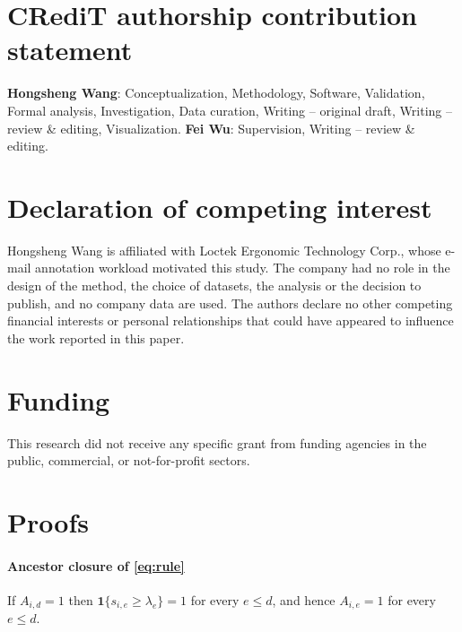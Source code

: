 \documentclass[preprint,12pt]{elsarticle}
\theoremstyle{definition}
\theoremstyle{remark}
\begin{document}
\section*{CRediT authorship contribution statement}
\textbf{Hongsheng Wang}: Conceptualization, Methodology, Software, Validation,
Formal analysis, Investigation, Data curation, Writing -- original draft,
Writing -- review \& editing, Visualization. \textbf{Fei Wu}: Supervision,
Writing -- review \& editing.

\section*{Declaration of competing interest}
Hongsheng Wang is affiliated with Loctek Ergonomic Technology Corp., whose
e-mail annotation workload motivated this study. The company had no role in the
design of the method, the choice of datasets, the analysis or the decision to
publish, and no company data are used. The authors declare no other competing
financial interests or personal relationships that could have appeared to
influence the work reported in this paper.

\section*{Funding}
This research did not receive any specific grant from funding agencies in the
public, commercial, or not-for-profit sectors.




\appendix
\section{Proofs}
\label{app:proofs}

\paragraph{Ancestor closure of \eqref{eq:rule}}
If $A_{i,d}=1$ then $\mathbf{1}\{s_{i,e}\ge\lambda_e\}=1$ for every $e\le d$, and
hence $A_{i,e}=1$ for every $e\le d$.
\end{document}

